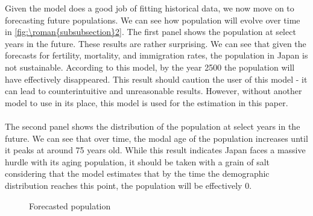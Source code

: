 \documentclass{article}
\renewcommand{\thesubsubsection}{\roman{subsubsection}}
\numberwithin{equation}{subsection}
\newcommand*{\FigureDir}{../../graphs}
\begin{document}
\begin{appendices}
\noindent
Given the model does a good job of fitting historical data, we now move on to forecasting future populations. We can see how population will evolve over time in \autoref{fig:\thesubsubsection2}. The first panel shows the population at select years in the future. These results are rather surprising. We can see that given the forecasts for fertility, mortality, and immigration rates, the population in Japan is not sustainable. According to this model, by the year 2500 the population will have effectively disappeared. This result should caution the user of this model - it can lead to counterintuitive and unreasonable results. However, without another model to use in its place, this model is used for the estimation in this paper.
\\\\
The second panel shows the distribution of the population at select years in the future. We can see that over time, the modal age of the population increases until it peaks at around 75 years old. While this result indicates Japan faces a massive hurdle with its aging population, it should be taken with a grain of salt considering that the model estimates that by the time the demographic distribution reaches this point, the population will be effectively 0.

\begin{figure}[H]
   \centering
   \caption{\label{fig:\thesubsubsection2}Forecasted population}
\end{figure}

\end{appendices}
\end{document}
